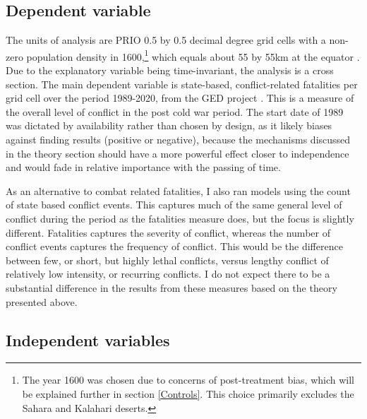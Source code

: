 \documentclass[12pt]{article}
\begin{document}
\subsection{Dependent variable} \label{Dependent variable}

The units of analysis are PRIO 0.5 by 0.5 decimal degree grid cells with a
non-zero population density in 1600,\footnote{The year 1600 was chosen due to
	concerns of post-treatment bias, which will be explained further in
	section \ref{Controls}. This choice primarily excludes the Sahara and
Kalahari deserts.} which equals about 55 by 55km at the equator
\citep{Tollefsen2012}. Due to the explanatory variable being time-invariant, the
analysis is a cross section. The main dependent variable is state-based,
conflict-related fatalities per grid cell over the period 1989-2020, from the
GED project \citep{Sundberg2013}. This is a measure of the overall level of
conflict in the post cold war period. The start date of 1989 was dictated by
availability rather than chosen by design, as it likely biases against finding
results (positive or negative), because the mechanisms discussed in the theory
section should have a more powerful effect closer to independence and would fade
in relative importance with the passing of time.

As an alternative to combat related fatalities, I also ran models using the
count of state based conflict events. This captures much of the same general
level of conflict during the period as the fatalities measure does, but the
focus is slightly different. Fatalities captures the severity of conflict,
whereas the number of conflict events captures the frequency of conflict. This
would be the difference between few, or short, but highly lethal conflicts,
versus lengthy conflict of relatively low intensity, or recurring conflicts. I
do not expect there to be a substantial difference in the results from these
measures based on the theory presented above.


\subsection{Independent variables} \label{Independent variable}
\end{document}
